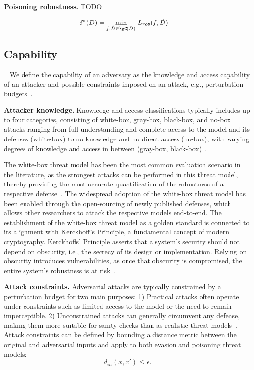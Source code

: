 \textbf{Poisoning robustness.} TODO

\begin{equation}
    \begin{aligned}
    \delta^*(D) = \min_{f, \tilde{D} \in \gC(D)} \; & L_{rob} (f, \tilde{D}) 
    \end{aligned}
\end{equation}

\subsection{Capability}~\label{sec:tax-capability} We define the capability of an adversary as the knowledge and access capability of an attacker and possible constraints imposed on an attack, e.g., perturbation budgets~\cite{carlini_evaluating_2019}. 

\textbf{Attacker knowledge.} Knowledge and access classifications typically includes up to four categories, consisting of white-box, gray-box, black-box, and no-box attacks ranging from full understanding and complete access to the model and its defenses (white-box) to no knowledge and no direct access (no-box), with varying degrees of knowledge and access in between (gray-box, black-box)~\citep{papernot_practical_2017, bose_adversarial_2020}.

The white-box threat model has been the most common evaluation scenario in the literature, as the strongest attacks can be performed in this threat model, thereby providing the most accurate quantification of the robustness of a respective defense~\citep{papernot_practical_2017}. The widespread adoption of the white-box threat model has been enabled through the open-sourcing of newly published defenses, which allows other researchers to attack the respective models end-to-end. The establishment of the white-box threat model as a golden standard is connected to its alignment with Kerckhoff’s Principle, a fundamental concept of modern cryptography. Kerckhoffs’ Principle asserts that a system's security should not depend on obscurity, i.e., the secrecy of its design or implementation. Relying on obscurity introduces vulnerabilities, as once that obscurity is compromised, the entire system's robustness is at risk~\citep{sasa_kerk_2008,athalye_obfuscated_2018}.

\textbf{Attack constraints.} Adversarial attacks are typically constrained by a perturbation budget for two main purposes: 1) Practical attacks often operate under constraints such as limited access to the model or the need to remain imperceptible. 2) Unconstrained attacks can generally circumvent any defense, making them more suitable for sanity checks than as realistic threat models~\cite{}. Attack constraints can be defined by bounding a distance metric between the original and adversarial inputs and apply to both evasion and poisoning threat models:
$$d_{in}(x, x') \leq \epsilon.$$

